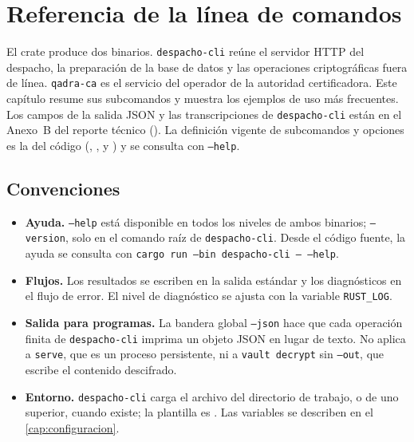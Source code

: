 \chapter{Referencia de la línea de comandos}\label{cap:cli}

El crate  produce dos binarios. \texttt{despacho-cli}
reúne el servidor HTTP del despacho, la preparación de la base de datos y las
operaciones criptográficas fuera de línea. \texttt{qadra-ca} es el servicio
del operador de la autoridad certificadora. Este capítulo resume sus subcomandos y
muestra los ejemplos de uso más frecuentes. Los campos de la salida JSON y
las transcripciones de \texttt{despacho-cli} están en el Anexo~B del reporte
técnico (). La definición vigente de
subcomandos y opciones es la del código (,
, 
y ) y se consulta con \texttt{--help}.

\section{Convenciones}\label{sec:cli-convenciones}

\begin{itemize}
  \item \textbf{Ayuda.} \texttt{--help} está disponible en todos los niveles
    de ambos binarios; \texttt{--version}, solo en el comando raíz de
    \texttt{despacho-cli}. Desde el código fuente, la ayuda se consulta con
    \texttt{cargo run --bin despacho-cli -- --help}.
  \item \textbf{Flujos.} Los resultados se escriben en la salida estándar y
    los diagnósticos en el flujo de error. El nivel de diagnóstico se ajusta
    con la variable \texttt{RUST\_LOG}.
  \item \textbf{Salida para programas.} La bandera global \texttt{--json} hace
    que cada operación finita de \texttt{despacho-cli} imprima un objeto JSON
    en lugar de texto. No aplica a \texttt{serve}, que es un proceso
    persistente, ni a \texttt{vault decrypt} sin \texttt{--out}, que escribe
    el contenido descifrado.
  \item \textbf{Entorno.} \texttt{despacho-cli} carga el archivo
     del directorio de trabajo, o de uno superior, cuando
    existe; la plantilla es
    . Las variables se describen en el
    \cref{cap:configuracion}.
\end{itemize}

